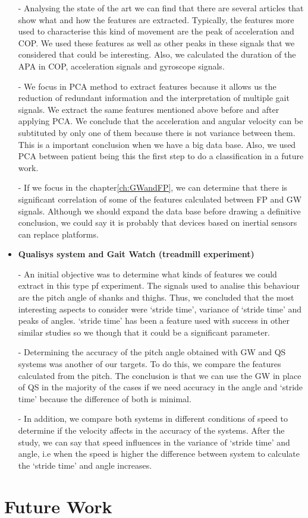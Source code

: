 \begin{itemize}
-	Analysing the state of the art we can find that there are several articles that show what and how the features are extracted. Typically, the features more used to characterise this kind of movement are the peak of acceleration and COP. We used these features  as well as other peaks in these signals that we considered that could be interesting. Also, we calculated the duration of the APA in COP, acceleration signals and gyroscope signals.

-	We focus in PCA method to extract features because it allows us the reduction of redundant information and the interpretation of multiple gait signals. We extract the same features mentioned above before and after applying PCA. We conclude that the acceleration and angular velocity can be subtituted by only one of them because there is not variance between them. This is a important conclusion when we have  a big data base. 
Also, we used PCA between patient  being this the first step to do a classification in a future work.

-	If we focus in the chapter\ref{ch:GWandFP}, we can determine that there is significant correlation  of some of the features calculated between FP and GW signals. Although  we should expand the data base before drawing a definitive conclusion, we could say  it is probably that devices based on inertial sensors can replace platforms.



\item \textbf{Qualisys system and Gait Watch (treadmill experiment)}

-	An initial objective was to determine what kinds of features we could extract in this type pf experiment. The signals used to analise this behaviour are the pitch angle of shanks and thighs. Thus, we concluded that the most interesting aspects to consider were ‘stride time’, variance of ‘stride time’  and peaks of angles. ‘stride time’ has been a feature used with success in other similar studies so we though that it could be a significant parameter.

-	Determining the accuracy of the pitch angle obtained with GW and QS systems was another of our targets. To do this, we compare the features calculated from the pitch. The conclusion is that we can use the GW in place of QS in the majority of the cases if we need accuracy in the angle and ‘stride time’ because the difference of both is minimal.

-	In addition, we compare both systems in different conditions of speed to determine if the velocity affects in the accuracy of the systems. After the study, we can say that speed influences in the variance of ‘stride time’ and angle, i.e when the speed is higher the difference between system to calculate the ‘stride time’ and angle increases. 
\end{itemize}
\section{Future Work}